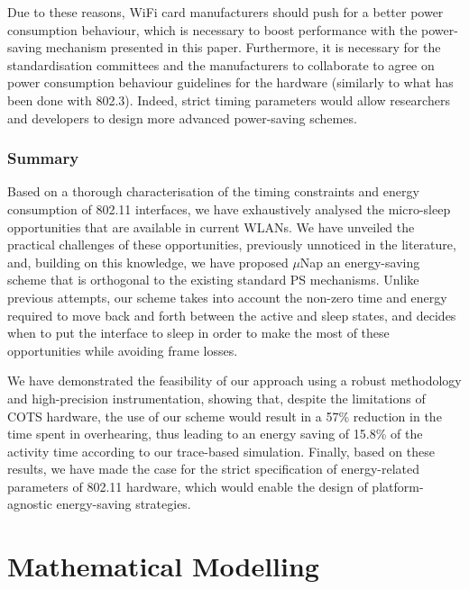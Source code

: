 \documentclass[twoside,nohyper]{tufte-book}
\newcommand{\partseparator}{
  \noindent\leavevmode\leaders\hrule height 0.8ex depth \dimexpr0.4pt-0.8ex\hfill\kern0pt
  \newline~\vspace{-0.5\baselineskip}\newline}
\theoremstyle{definition}
\theoremstyle{definition}
\theoremstyle{definition}
\theoremstyle{remark}
\begin{document}
Due to these reasons, WiFi card manufacturers should push for a better
power consumption behaviour, which is necessary to boost performance
with the power-saving mechanism presented in this paper. Furthermore, it
is necessary for the standardisation committees and the manufacturers to
collaborate to agree on power consumption behaviour guidelines for the
hardware (similarly to what has been done with 802.3). Indeed, strict
timing parameters would allow researchers and developers to design more
advanced power-saving schemes.

\hypertarget{summary-2}{%
\section{Summary}\label{summary-2}}

Based on a thorough characterisation of the timing constraints and
energy consumption of 802.11 interfaces, we have exhaustively analysed
the micro-sleep opportunities that are available in current WLANs. We
have unveiled the practical challenges of these opportunities,
previously unnoticed in the literature, and, building on this knowledge,
we have proposed
\(\mu\)Nap\cite[0pt]{contrib-05a,contrib-05b}
an energy-saving scheme that is orthogonal to the existing standard PS
mechanisms. Unlike previous attempts, our scheme takes into account the
non-zero time and energy required to move back and forth between the
active and sleep states, and decides when to put the interface to sleep
in order to make the most of these opportunities while avoiding frame
losses.

We have demonstrated the feasibility of our approach using a robust
methodology and high-precision instrumentation, showing that, despite
the limitations of COTS hardware, the use of our scheme would result in
a 57\% reduction in the time spent in overhearing, thus leading to an
energy saving of 15.8\% of the activity time according to our
trace-based simulation. Finally, based on these results, we have made
the case for the strict specification of energy-related parameters of
802.11 hardware, which would enable the design of platform-agnostic
energy-saving strategies.

\addtocontents{toc}{\partseparator}

\hypertarget{part-mathematical-modelling}{%
\part{Mathematical
Modelling}\label{part-mathematical-modelling}}
\end{document}
